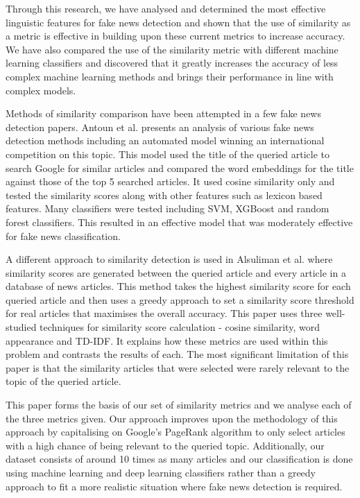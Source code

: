 \documentclass{article}
\begin{document}
Through this research, we have analysed and determined the most effective linguistic features for fake news detection and shown that the use of similarity as a metric is effective in building upon these current metrics to increase accuracy. We have also compared the use of the similarity metric with different machine learning classifiers and discovered that it greatly increases the accuracy of less complex machine learning methods and brings their performance in line with complex models.


Methods of similarity comparison have been attempted in a few fake news detection papers. Antoun et al. \cite{antoun2020state}
presents an analysis of various fake news detection methods including an automated model winning an international competition on this topic. This model used the title of the queried article to search Google for similar articles and compared the word embeddings for the title against those of the top 5 searched articles. It used cosine similarity only and tested the similarity scores along with other features such as lexicon based features. Many classifiers were tested including SVM, XGBoost and random forest classifiers. This resulted in an effective model that was moderately effective for fake news classification.

A different approach to similarity detection is used in Alsuliman et al. \cite{alsuliman2022social} where similarity scores are generated between the queried article and every article in a database of news articles. This method takes the highest similarity score for each queried article and then uses a greedy approach to set a similarity score threshold for real articles that maximises the overall accuracy. This paper uses three well-studied techniques for similarity score calculation - cosine similarity, word appearance and TD-IDF. It explains how these metrics are used within this problem and contrasts the results of each. The most significant limitation of this paper is that the similarity articles that were selected were rarely relevant to the topic of the queried article.

This paper forms the basis of our set of similarity metrics and we analyse each of the three metrics given. Our approach improves upon the methodology of this approach by capitalising on Google's PageRank algorithm to only select articles with a high chance of being relevant to the queried topic. Additionally, our dataset consists of around 10 times as many articles and our classification is done using machine learning and deep learning classifiers rather than a greedy approach to fit a more realistic situation where fake news detection is required.
\end{document}
